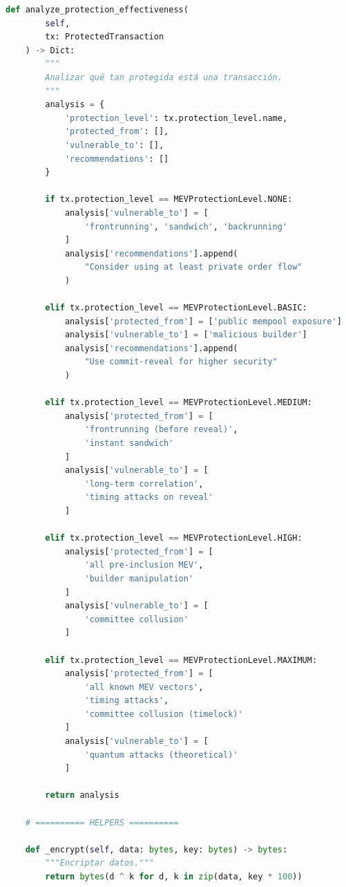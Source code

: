 \documentclass[11pt,a4paper,twoside]{book}
\theoremstyle{definition}
\theoremstyle{remark}
\begin{document}
\begin{lstlisting}[language=Python, caption={Sistema de protección MEV}]
    def analyze_protection_effectiveness(
        self,
        tx: ProtectedTransaction
    ) -> Dict:
        """
        Analizar qué tan protegida está una transacción.
        """
        analysis = {
            'protection_level': tx.protection_level.name,
            'protected_from': [],
            'vulnerable_to': [],
            'recommendations': []
        }
        
        if tx.protection_level == MEVProtectionLevel.NONE:
            analysis['vulnerable_to'] = [
                'frontrunning', 'sandwich', 'backrunning'
            ]
            analysis['recommendations'].append(
                "Consider using at least private order flow"
            )
            
        elif tx.protection_level == MEVProtectionLevel.BASIC:
            analysis['protected_from'] = ['public mempool exposure']
            analysis['vulnerable_to'] = ['malicious builder']
            analysis['recommendations'].append(
                "Use commit-reveal for higher security"
            )
            
        elif tx.protection_level == MEVProtectionLevel.MEDIUM:
            analysis['protected_from'] = [
                'frontrunning (before reveal)',
                'instant sandwich'
            ]
            analysis['vulnerable_to'] = [
                'long-term correlation',
                'timing attacks on reveal'
            ]
            
        elif tx.protection_level == MEVProtectionLevel.HIGH:
            analysis['protected_from'] = [
                'all pre-inclusion MEV',
                'builder manipulation'
            ]
            analysis['vulnerable_to'] = [
                'committee collusion'
            ]
            
        elif tx.protection_level == MEVProtectionLevel.MAXIMUM:
            analysis['protected_from'] = [
                'all known MEV vectors',
                'timing attacks',
                'committee collusion (timelock)'
            ]
            analysis['vulnerable_to'] = [
                'quantum attacks (theoretical)'
            ]
        
        return analysis
    
    # ========== HELPERS ==========
    
    def _encrypt(self, data: bytes, key: bytes) -> bytes:
        """Encriptar datos."""
        return bytes(d ^ k for d, k in zip(data, key * 100))
    

\end{lstlisting}
\end{document}
